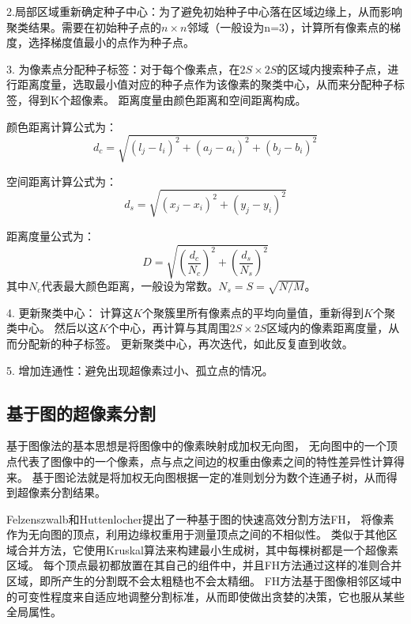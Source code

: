2.局部区域重新确定种子中心：为了避免初始种子中心落在区域边缘上，从而影响聚类结果。需要在初始种子点的$n\times n$邻域（一般设为n=3），计算所有像素点的梯度，选择梯度值最小的点作为种子点。

3. 为像素点分配种子标签：对于每个像素点，在$2S\times 2S$的区域内搜索种子点，进行距离度量，选取最小值对应的种子点作为该像素的聚类中心，从而来分配种子标签，得到K个超像素。
距离度量由颜色距离和空间距离构成。

颜色距离计算公式为：
\begin{equation}
d_c=\sqrt{\left ( l_j-l_i\right )^{2}+\left ( a_j-a_i\right )^{2}+\left ( b_j-b_i\right )^{2}}
\end{equation}

空间距离计算公式为：
\begin{equation}
d_s=\sqrt{\left ( x_j-x_i\right )^{2}+\left ( y_j-y_i\right )^{2}}
\end{equation}

距离度量公式为：
\begin{equation}
D = \sqrt{\left ( \frac{d_c}{N_c}\right )^{2}+\left ( \frac{d_s}{N_s}\right )^{2}}
\end{equation}
其中$N_c$代表最大颜色距离，一般设为常数。$N_s=S=\sqrt{N/M}$。

4. 更新聚类中心：
计算这$K$个聚簇里所有像素点的平均向量值，重新得到$K$个聚类中心。
然后以这$K$个中心，再计算与其周围$2S\times 2S$区域内的像素距离度量，从而分配新的种子标签。
更新聚类中心，再次迭代，如此反复直到收敛。

5. 增加连通性：避免出现超像素过小、孤立点的情况。

\subsection{基于图的超像素分割}
基于图像法的基本思想是将图像中的像素映射成加权无向图，
无向图中的一个顶点代表了图像中的一个像素，点与点之间边的权重由像素之间的特性差异性计算得来。
基于图论法就是将加权无向图根据一定的准则划分为数个连通子树，从而得到超像素分割结果。

Felzenszwalb和Huttenlocher提出了一种基于图的快速高效分割方法FH\cite{felzenszwalb2004efficient}，
将像素作为无向图的顶点，利用边缘权重用于测量顶点之间的不相似性。
类似于其他区域合并方法，它使用Kruskal\cite{2003Boruvka}算法来构建最小生成树，其中每棵树都是一个超像素区域。
每个顶点最初都放置在其自己的组件中，并且FH方法通过这样的准则合并区域，即所产生的分割既不会太粗糙也不会太精细。
FH方法基于图像相邻区域中的可变性程度来自适应地调整分割标准，从而即使做出贪婪的决策，它也服从某些全局属性。

